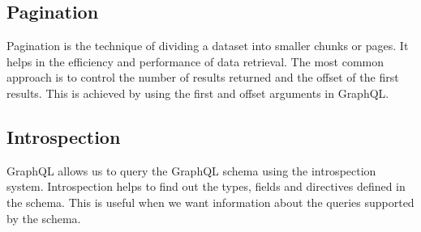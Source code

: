 \subsection{Pagination}
Pagination is the technique of dividing a dataset into smaller chunks or pages. It helps in the efficiency and performance of data retrieval. The most common approach is to control the number of results returned and the offset of the first results. This is achieved by using the first and offset arguments in GraphQL.

\subsection{Introspection}
GraphQL allows us to query the GraphQL schema using the introspection system. Introspection helps to find out the types, fields and directives defined in the schema. This is useful when we want information about the queries supported by the schema.


